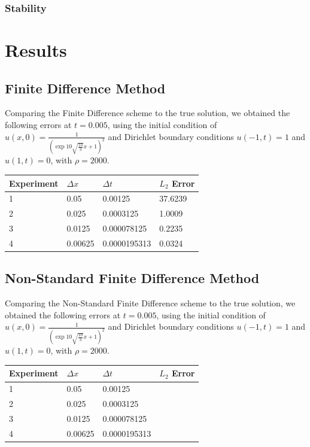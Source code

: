 \documentclass[a4paper]{article}
\begin{document}
		\subsubsection{Stability}
		
\section{Results}\label{sec:results}
	\subsection{Finite Difference Method}
	Comparing the Finite Difference scheme to the true solution, we obtained the following errors at $t=0.005$, using the initial condition of $u(x,0)=\frac{1}{(\exp{10\sqrt{\frac{10}{3}}x}+1)^2}$ and Dirichlet boundary conditions $u(-1, t) = 1$ and $u(1, t) = 0$, with $\rho =2000$. 
    	
    	\begin{table}[H]
            \begin{tabular}{|l|l|l|l|}
            \hline
            Experiment & $\Delta x$ & $\Delta t$   & $L_2$ Error \\ \hline
            1          & 0.05       & 0.00125      & 37.6239\\ \hline
            2          & 0.025      & 0.0003125    & 1.0009\\ \hline
            3          & 0.0125     & 0.000078125  & 0.2235\\ \hline
            4          & 0.00625    & 0.0000195313 & 0.0324\\ \hline
            \end{tabular}
        \end{table}
	\subsection{Non-Standard Finite Difference Method}
    	Comparing the Non-Standard Finite Difference scheme to the true solution, we obtained the following errors at $t=0.005$, using the initial condition of $u(x,0)=\frac{1}{(\exp{10\sqrt{\frac{10}{3}}x}+1)^2}$ and Dirichlet boundary conditions $u(-1, t) = 1$ and $u(1, t) = 0$, with $\rho =2000$. 
    	
    	\begin{table}[H]
            \begin{tabular}{|l|l|l|l|}
            \hline
            Experiment & $\Delta x$ & $\Delta t$   & $L_2$ Error \\ \hline
            1          & 0.05       & 0.00125      &    \\ \hline
            2          & 0.025      & 0.0003125    &    \\ \hline
            3          & 0.0125     & 0.000078125  &   \\ \hline
            4          & 0.00625    & 0.0000195313 &   \\ \hline
            \end{tabular}
        \end{table}
	
\end{document}
